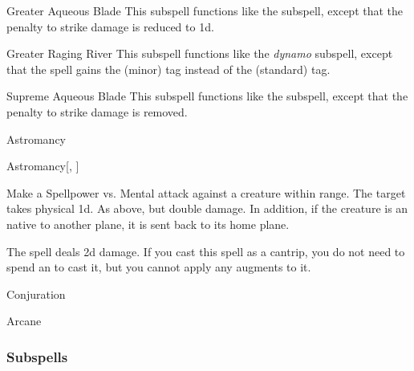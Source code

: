 \begin{ability}[\nth{6}]{Greater Aqueous Blade}
This subspell functions like the  subspell, except that the penalty to strike damage is reduced to \minus1d.
\end{ability}
\vspace{0.25em}


\begin{ability}[\nth{7}]{Greater Raging River}
This subspell functions like the \textit{dynamo} subspell, except that the spell gains the  (minor) tag instead of the  (standard) tag.
\end{ability}
\vspace{0.25em}


\begin{ability}[\nth{9}]{Supreme Aqueous Blade}
This subspell functions like the  subspell, except that the penalty to strike damage is removed.
\end{ability}
\vspace{0.25em}

\newpage
\begin{spellsection}{Astromancy}

\begin{spellheader}
\end{spellheader}


\begin{ability}{Astromancy}[, ]

Make a Spellpower vs. Mental attack against a creature within \rngmed range.
\hit The target takes physical  \plus1d.
\crit As above, but double damage.
In addition, if the creature is an  native to another plane, it is sent back to its home plane.

\end{ability}



 The spell deals \minus2d damage. If you cast this spell as a cantrip,
you do not need to spend an  to cast it,
but you cannot apply any augments to it.


 Conjuration

 Arcane
\end{spellsection}


\subsubsection{Subspells}



